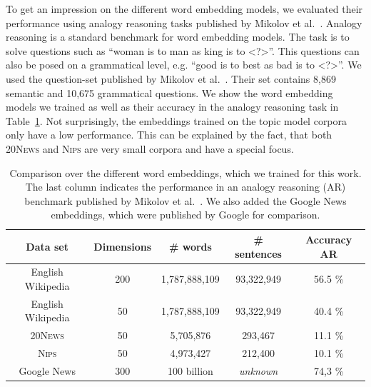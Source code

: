 \documentclass[
        a4paper,
        titlepage,
        twoside,
        parskip
        ]{scrbook}
\newcommand{\ra}[1]{\renewcommand{\arraystretch}{#1}}
\theoremstyle{break}
\begin{document}
To get an impression on the different word embedding models, we evaluated their performance using analogy reasoning tasks published by Mikolov et al.~\cite{Mikolov2013}.
Analogy reasoning is a standard benchmark for word embedding models.
The task is to solve questions such as ``woman is to man as king is to \textless?\textgreater''.
This questions can also be posed on a grammatical level, e.g. ``good is to best as bad is to \textless?\textgreater''.
We used the question-set published by Mikolov et al.~\cite{Mikolov2013b}.
Their set contains 8,869 semantic and 10,675 grammatical questions.
We show the word embedding models we trained as well as their accuracy in the analogy reasoning task in Table~\ref{table:word_embeddings_performance}.
Not surprisingly, the embeddings trained on the topic model corpora only have a low performance.
This can be explained by the fact, that both \textsc{20News} and \textsc{Nips} are very small corpora and have a special focus.

\begin{table}[]
  \ra{1.3}
  \centering
  \caption{Comparison over the different word embeddings, which we trained for this work.
  The last column indicates the performance in an analogy reasoning (AR) benchmark published by Mikolov et al.~\cite{Mikolov2013b}.
  We also added the Google News embeddings, which were published by Google for comparison.}
  \label{table:word_embeddings_performance}
  \begin{tabular}{ccccc}
    \toprule
    \textbf{Data set} & \textbf{Dimensions} & \textbf{\# words} & \textbf{\# sentences} & \textbf{Accuracy AR} \\
    \midrule
    English Wikipedia & 200                 & 1,787,888,109     & 93,322,949            & 56.5 \%              \\
    English Wikipedia & 50                  & 1,787,888,109     & 93,322,949            & 40.4 \%              \\
    \textsc{20News}            & 50                  & 5,705,876         & 293,467               & 11.1 \%              \\
    \textsc{Nips}              & 50                  & 4,973,427         & 212,400               & 10.1 \%              \\
    Google News       & 300                 & 100 billion       & \textit{unknown}      & 74,3 \%              \\
    \bottomrule
  \end{tabular}
\end{table}
\end{document}
